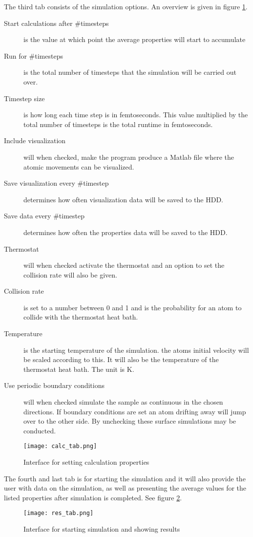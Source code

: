 The third tab consists of the simulation options. An overview is given in figure \ref{fig:calc_tab}. 
\begin{description}
	\item[Start calculations after \#timesteps] is the value at which point the average properties will start to accumulate
	\item[Run for \#timesteps] is the total number of timesteps that the simulation will be carried out over. 
	\item[Timestep size] is how long each time step is in femtoseconds. This value multiplied by the total number of timesteps is the total runtime in femtoseconds. 
	\item[Include visualization] will when checked, make the program produce a Matlab file where the atomic movements can be visualized.
	\item[Save visualization every \#timestep] determines how often visualization data will be saved to the HDD.
	\item[Save data every \#timestep] determines how often the properties data will be saved to the HDD.
	\item[Thermostat] will when checked activate the thermostat and an option to set the collision rate will also be given.
	\item[Collision rate] is set to a number between 0 and 1 and is the probability for an atom to collide with the thermostat heat bath.
	\item[Temperature] is the starting temperature of the simulation. the atoms initial velocity will be scaled according to this. It will also be the temperature of the thermostat heat bath. The unit is K.
	\item[Use periodic boundary conditions] will when checked simulate the sample as continuous in the chosen directions. If boundary conditions are set an atom drifting away will jump over to the other side. By unchecking these surface simulations may be conducted.
\end{description}
\begin{figure}[h!]
	\centering
	\texttt{[image: calc\_tab.png]}
	\caption{Interface for setting calculation properties}
	\label{fig:calc_tab}
\end{figure}
	
The fourth and last tab is for starting the simulation and it will also provide the user with data on the simulation, as well as presenting the average values for the listed properties after simulation is completed. See figure \ref{fig:res_tab}.
\begin{figure}[h!]
	\centering
	\texttt{[image: res\_tab.png]}
	\caption{Interface for starting simulation and showing results}
	\label{fig:res_tab}
\end{figure}

